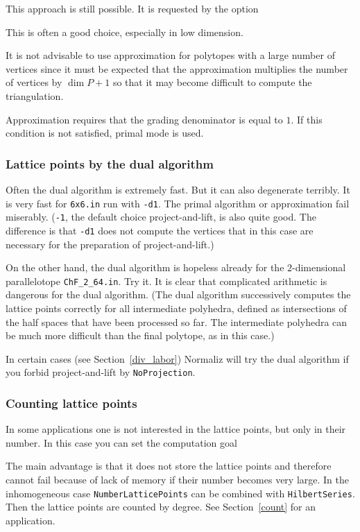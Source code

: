 This approach is still possible. It is requested by the option
\begin{itemize}
	\itemtt [Approximate, -r]
\end{itemize}

This is often a good choice, especially in low dimension.

It is not advisable to use approximation for polytopes with a large number of vertices since it must be expected that the approximation multiplies the number of vertices by $\dim P+1$ so that it may become difficult to compute the triangulation.

Approximation requires that the grading denominator is equal to $1$. If this condition is not satisfied, primal mode is used.

\subsubsection{Lattice points by the dual algorithm}

Often the dual algorithm is extremely fast. But it can also degenerate terribly. It is very fast for \verb|6x6.in| run with \verb|-d1|. The primal algorithm or approximation fail miserably. (\verb|-1|, the default choice project-and-lift, is also quite good. The difference is that \verb|-d1| does not compute the vertices that in this case are necessary for the preparation of project-and-lift.)

On the other hand, the dual algorithm is hopeless already for the $2$-dimensional parallelotope \verb|ChF_2_64.in|. Try it. It is clear that complicated arithmetic is dangerous for the dual algorithm. (The dual algorithm successively computes the lattice points correctly for all intermediate polyhedra, defined as intersections of the half spaces that have been processed so far. The intermediate polyhedra can be much more difficult than the final polytope, as in this case.)

In certain cases (see Section~\ref{div_labor}) Normaliz will try the dual algorithm if you forbid project-and-lift by \verb|NoProjection|.

\subsubsection{Counting lattice points}\label{Counting}

In some applications one is not interested in the lattice points, but only in their number. In this case you can set the computation goal
\begin{itemize}
	\itemtt [NumberLatticePoints]
\end{itemize}
The main advantage is that it does not store the lattice points and therefore cannot fail because of lack of memory if their number becomes very large. In the inhomogeneous case \verb|NumberLatticePoints| can be combined with \verb|HilbertSeries|. Then the lattice points are counted by degree. See Section~\ref{count} for an application.

